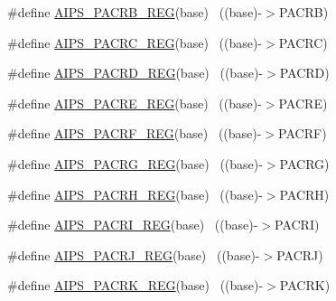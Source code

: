 \begin{DoxyCompactItemize}
\item 
\#define \hyperlink{group___a_i_p_s___register___accessor___macros_ga9ef244a0063130484f0c49a3d504fc5b}{A\+I\+P\+S\+\_\+\+P\+A\+C\+R\+B\+\_\+\+R\+EG}(base)                                      ~((base)-\/$>$P\+A\+C\+RB)
\item 
\#define \hyperlink{group___a_i_p_s___register___accessor___macros_ga78c7a08f917ec00d68544b8463bbb06b}{A\+I\+P\+S\+\_\+\+P\+A\+C\+R\+C\+\_\+\+R\+EG}(base)                                      ~((base)-\/$>$P\+A\+C\+RC)
\item 
\#define \hyperlink{group___a_i_p_s___register___accessor___macros_ga60f95b6f529c1f86b3fa90f2dfabe604}{A\+I\+P\+S\+\_\+\+P\+A\+C\+R\+D\+\_\+\+R\+EG}(base)                                      ~((base)-\/$>$P\+A\+C\+RD)
\item 
\#define \hyperlink{group___a_i_p_s___register___accessor___macros_ga0ffe27f782cfd17219262c14978ba385}{A\+I\+P\+S\+\_\+\+P\+A\+C\+R\+E\+\_\+\+R\+EG}(base)                                      ~((base)-\/$>$P\+A\+C\+RE)
\item 
\#define \hyperlink{group___a_i_p_s___register___accessor___macros_ga01a04977f704838f7aecf35adfaaa5f6}{A\+I\+P\+S\+\_\+\+P\+A\+C\+R\+F\+\_\+\+R\+EG}(base)                                      ~((base)-\/$>$P\+A\+C\+RF)
\item 
\#define \hyperlink{group___a_i_p_s___register___accessor___macros_ga3dfe3bc1cba527813e4c6e8edb0754c8}{A\+I\+P\+S\+\_\+\+P\+A\+C\+R\+G\+\_\+\+R\+EG}(base)                                      ~((base)-\/$>$P\+A\+C\+RG)
\item 
\#define \hyperlink{group___a_i_p_s___register___accessor___macros_ga70fe12499dcff4c1cd86c407b7243603}{A\+I\+P\+S\+\_\+\+P\+A\+C\+R\+H\+\_\+\+R\+EG}(base)                                      ~((base)-\/$>$P\+A\+C\+RH)
\item 
\#define \hyperlink{group___a_i_p_s___register___accessor___macros_gae8f9e75bc6e77812a3e9814ef3edd1f7}{A\+I\+P\+S\+\_\+\+P\+A\+C\+R\+I\+\_\+\+R\+EG}(base)                                      ~((base)-\/$>$P\+A\+C\+RI)
\item 
\#define \hyperlink{group___a_i_p_s___register___accessor___macros_ga0d8e502845b69ce0b8dbfd16b115ee78}{A\+I\+P\+S\+\_\+\+P\+A\+C\+R\+J\+\_\+\+R\+EG}(base)                                      ~((base)-\/$>$P\+A\+C\+RJ)
\item 
\#define \hyperlink{group___a_i_p_s___register___accessor___macros_gad254171eacb0d0003ba2f458d3627682}{A\+I\+P\+S\+\_\+\+P\+A\+C\+R\+K\+\_\+\+R\+EG}(base)                                      ~((base)-\/$>$P\+A\+C\+RK)

\end{DoxyCompactItemize}
